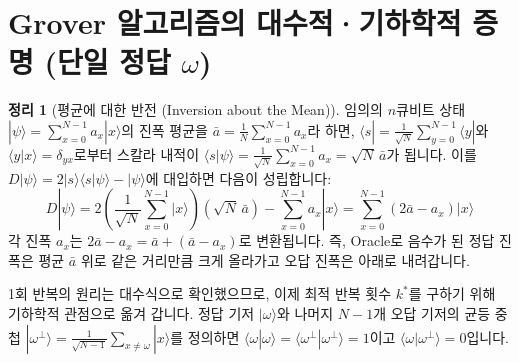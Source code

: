 \documentclass[11pt, a4paper]{article}
\newcommand{\ket}[1]{|#1\rangle}
\newcommand{\bra}[1]{\langle#1|}
\newcommand{\braket}[2]{\langle#1|#2\rangle}
\theoremstyle{definition}
\newtheorem{theorem}{정리}[section]
\begin{document}
\section{Grover 알고리즘의 대수적·기하학적 증명 (단일 정답 \texorpdfstring{$\omega$}{omega})}
\begin{theorem}[평균에 대한 반전 (Inversion about the Mean)]
임의의 $n$큐비트 상태 $\ket{\psi} = \sum_{x=0}^{N-1} a_x\ket{x}$의 진폭 평균을 $\bar{a} = \frac{1}{N}\sum_{x=0}^{N-1} a_x$라 하면, $\bra{s} = \frac{1}{\sqrt{N}}\sum_{y=0}^{N-1}\bra{y}$와 $\braket{y}{x} = \delta_{yx}$로부터 스칼라 내적이 $\braket{s}{\psi} = \frac{1}{\sqrt{N}}\sum_{x=0}^{N-1} a_x = \sqrt{N}\,\bar{a}$가 됩니다. 이를 $D\ket{\psi} = 2\ket{s}\braket{s}{\psi} - \ket{\psi}$에 대입하면 다음이 성립합니다:
$$D\ket{\psi} = 2\left(\frac{1}{\sqrt{N}}\sum_{x=0}^{N-1}\ket{x}\right)(\sqrt{N}\,\bar{a}) - \sum_{x=0}^{N-1} a_x\ket{x} = \sum_{x=0}^{N-1} (2\bar{a} - a_x)\ket{x}$$
각 진폭 $a_x$는 $2\bar{a} - a_x = \bar{a} + (\bar{a} - a_x)$로 변환됩니다. 즉, Oracle로 음수가 된 정답 진폭은 평균 $\bar{a}$ 위로 같은 거리만큼 크게 올라가고 오답 진폭은 아래로 내려갑니다.
\end{theorem}

1회 반복의 원리는 대수식으로 확인했으므로, 이제 최적 반복 횟수 $k^*$를 구하기 위해 기하학적 관점으로 옮겨 갑니다. 정답 기저 $\ket{\omega}$와 나머지 $N-1$개 오답 기저의 균등 중첩 $\ket{\omega^\perp} = \frac{1}{\sqrt{N-1}}\sum_{x\neq\omega}\ket{x}$를 정의하면 $\braket{\omega}{\omega} = \braket{\omega^\perp}{\omega^\perp} = 1$이고 $\braket{\omega}{\omega^\perp} = 0$입니다.
\end{document}
